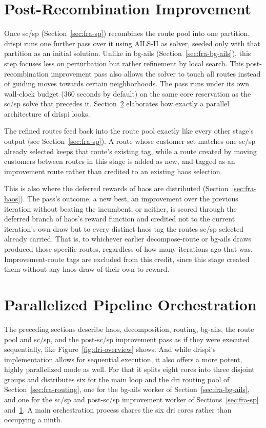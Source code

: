 \section{Post-Recombination Improvement}\label{sec:fra-improve}
Once \gls{sc}/\gls{sp} (Section~\ref{sec:fra-sp}) recombines the route pool into one partition, \gls{drispi} runs one further pass over it using AILS-II as solver, seeded only with that partition as an initial solution. Unlike in \gls{bg-ails} (Section~\ref{sec:fra-bg-ails}), this step focuses less on perturbation but rather refinement by local search. This post-recombination improvement pass also allows the solver to touch all routes instead of guiding moves towards certain neighborhoods. The pass runs under its own wall-clock budget (360 seconds by default) on the same core reservation as the \gls{sc}/\gls{sp} solve that precedes it. Section~\ref{sec:fra-pipeline} elaborates how exactly a parallel architecture of \gls{drispi} looks.

The refined routes feed back into the route pool exactly like every other stage's output (see Section~\ref{sec:fra-sp}). A route whose customer set matches one \gls{sc}/\gls{sp} already selected keeps that route's existing tag, while a route created by moving customers between routes in this stage is added as new, and tagged as an improvement route rather than credited to an existing \gls{haos} selection.

This is also where the deferred rewards of \gls{haos} are distributed (Section~\ref{sec:fra-haos}). The pass's outcome, a new best, an improvement over the previous iteration without beating the incumbent, or neither, is scored through the deferred branch of \gls{haos}'s reward function and credited not to the current iteration's own draw but to every distinct \gls{haos} tag the routes \gls{sc}/\gls{sp} selected already carried. That is, to whichever earlier decompose-route or \gls{bg-ails} draws produced those specific routes, regardless of how many iterations ago that was. Improvement-route tags are excluded from this credit, since this stage created them without any \gls{haos} draw of their own to reward.

\section{Parallelized Pipeline Orchestration}\label{sec:fra-pipeline}
The preceding sections describe \gls{haos}, decomposition, routing, \gls{bg-ails}, the route pool and \gls{sc}/\gls{sp}, and the post-\gls{sc}/\gls{sp} improvement pass as if they were executed sequentially, like Figure~\ref{fig:dri-overview} shows. And while \gls{drispi}'s implementation allows for sequential execution, it also offers a more potent, highly parallelized mode as well. For that it splits eight cores into three disjoint groups and distributes six for the main loop and the \gls{dri} routing pool of Section~\ref{sec:fra-routing}, one for the \gls{bg-ails} worker of Section~\ref{sec:fra-bg-ails}, and one for the \gls{sc}/\gls{sp} and post-\gls{sc}/\gls{sp} improvement worker of Sections~\ref{sec:fra-sp} and~\ref{sec:fra-improve}. A main orchestration process shares the six \gls{dri} cores rather than occupying a ninth.

